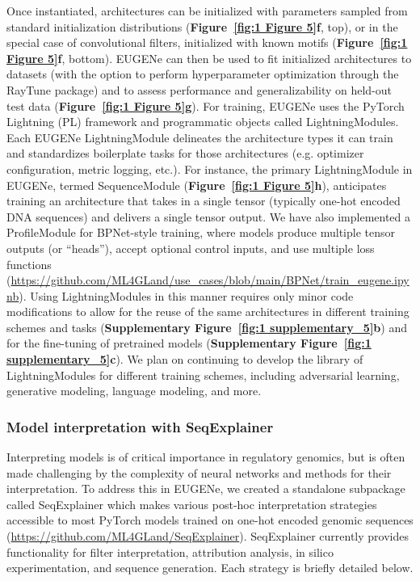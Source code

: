Once instantiated, architectures can be initialized with parameters sampled from standard initialization distributions (\textbf{Figure~\ref{fig:1 Figure 5}\textbf{f}}, top), or in the special case of convolutional filters, initialized with known motifs\cite{Quang2016-ll,Janssens2022-vy} (\textbf{Figure~\ref{fig:1 Figure 5}\textbf{f}}, bottom). EUGENe can then be used to fit initialized architectures to datasets (with the option to perform hyperparameter optimization through the RayTune package\cite{Moritz2017-tm}) and to assess performance and generalizability on held-out test data (\textbf{Figure~\ref{fig:1 Figure 5}\textbf{g}}). For training, EUGENe uses the PyTorch Lightning (PL) framework\cite{Falcon2020-zq} and programmatic objects called LightningModules. Each EUGENe LightningModule delineates the architecture types it can train and standardizes boilerplate tasks for those architectures (e.g. optimizer configuration, metric logging, etc.). For instance, the primary LightningModule in EUGENe, termed SequenceModule (\textbf{Figure~\ref{fig:1 Figure 5}\textbf{h}}), anticipates training an architecture that takes in a single tensor (typically one-hot encoded DNA sequences) and delivers a single tensor output. We have also implemented a ProfileModule for BPNet-style\cite{Avsec2021-sw} training, where models produce multiple tensor outputs (or “heads”), accept optional control inputs, and use multiple loss functions (\url{https://github.com/ML4GLand/use_cases/blob/main/BPNet/train_eugene.ipynb}). Using LightningModules in this manner requires only minor code modifications to allow for the reuse of the same architectures in different training schemes and tasks (\textbf{Supplementary Figure~\ref{fig:1 supplementary_5}\textbf{b}}) and for the fine-tuning of pretrained models (\textbf{Supplementary Figure~\ref{fig:1 supplementary_5}\textbf{c}}). We plan on continuing to develop the library of LightningModules for different training schemes, including adversarial learning\cite{Koo2019-dw}, generative modeling\cite{Taskiran2022-zj}, language modeling\cite{Ji2021-mj}, and more.

\subsubsection{Model interpretation with SeqExplainer}

Interpreting models is of critical importance in regulatory genomics\cite{Koo2020-vz,Novakovsky2022-ft,Talukder2021-wj}, but is often made challenging by the complexity of neural networks and methods for their interpretation. To address this in EUGENe, we created a standalone subpackage called SeqExplainer which makes various post-hoc interpretation strategies accessible to most PyTorch models trained on one-hot encoded genomic sequences (\url{https://github.com/ML4GLand/SeqExplainer}). SeqExplainer currently provides functionality for filter interpretation, attribution analysis, in silico experimentation, and sequence generation. Each strategy is briefly detailed below.

